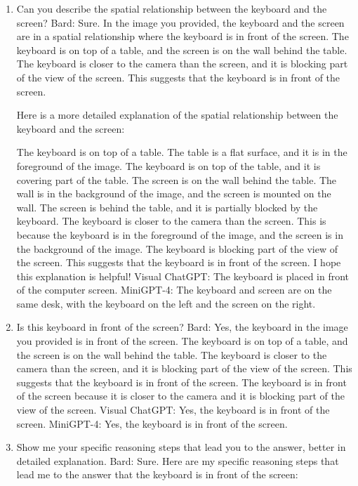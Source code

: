 \begin{enumerate}
    \item Can you describe the spatial relationship between the keyboard and the screen?
    \subitem Bard: Sure. In the image you provided, the keyboard and the screen are in a spatial relationship where the keyboard is in front of the screen. The keyboard is on top of a table, and the screen is on the wall behind the table. The keyboard is closer to the camera than the screen, and it is blocking part of the view of the screen. This suggests that the keyboard is in front of the screen.

    Here is a more detailed explanation of the spatial relationship between the keyboard and the screen:
    
    The keyboard is on top of a table. The table is a flat surface, and it is in the foreground of the image. The keyboard is on top of the table, and it is covering part of the table.
    The screen is on the wall behind the table. The wall is in the background of the image, and the screen is mounted on the wall. The screen is behind the table, and it is partially blocked by the keyboard.
    The keyboard is closer to the camera than the screen. This is because the keyboard is in the foreground of the image, and the screen is in the background of the image.
    The keyboard is blocking part of the view of the screen. This suggests that the keyboard is in front of the screen.
    I hope this explanation is helpful!
    \subitem Visual ChatGPT: The keyboard is placed in front of the computer screen.
    \subitem MiniGPT-4: The keyboard and screen are on the same desk, with the keyboard on the left and the screen on the right.
    \item Is this keyboard in front of the screen?
    \subitem Bard: Yes, the keyboard in the image you provided is in front of the screen. The keyboard is on top of a table, and the screen is on the wall behind the table. The keyboard is closer to the camera than the screen, and it is blocking part of the view of the screen. This suggests that the keyboard is in front of the screen. The keyboard is in front of the screen because it is closer to the camera and it is blocking part of the view of the screen.
    \subitem Visual ChatGPT: Yes, the keyboard is in front of the screen.
    \subitem MiniGPT-4: Yes, the keyboard is in front of the screen.
    \item Show me your specific reasoning steps that lead you to the answer, better in detailed explanation.
    \subitem Bard: 
    Sure. Here are my specific reasoning steps that lead me to the answer that the keyboard is in front of the screen:
    

\end{enumerate}
